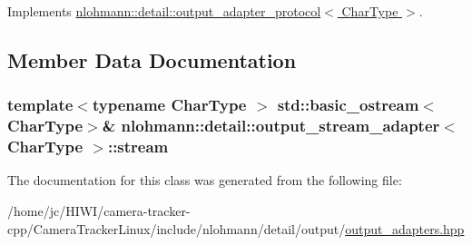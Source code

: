 Implements \hyperlink{structnlohmann_1_1detail_1_1output__adapter__protocol_a2f410a164e0eda17cf6561114b0eee4a}{nlohmann\+::detail\+::output\+\_\+adapter\+\_\+protocol$<$ Char\+Type $>$}.



\subsection{Member Data Documentation}
\subsubsection[{\texorpdfstring{stream}{stream}}]{\setlength{\rightskip}{0pt plus 5cm}template$<$typename Char\+Type $>$ std\+::basic\+\_\+ostream$<$Char\+Type$>$\& {\bf nlohmann\+::detail\+::output\+\_\+stream\+\_\+adapter}$<$ Char\+Type $>$\+::stream\hspace{0.3cm}{\ttfamily [private]}}\hypertarget{classnlohmann_1_1detail_1_1output__stream__adapter_aacc26af02e1e5a988bc5dbfb723b5562}{}\label{classnlohmann_1_1detail_1_1output__stream__adapter_aacc26af02e1e5a988bc5dbfb723b5562}


The documentation for this class was generated from the following file\+:\begin{DoxyCompactItemize}
\item 
/home/jc/\+H\+I\+W\+I/camera-\/tracker-\/cpp/\+Camera\+Tracker\+Linux/include/nlohmann/detail/output/\hyperlink{output__adapters_8hpp}{output\+\_\+adapters.\+hpp}\end{DoxyCompactItemize}
